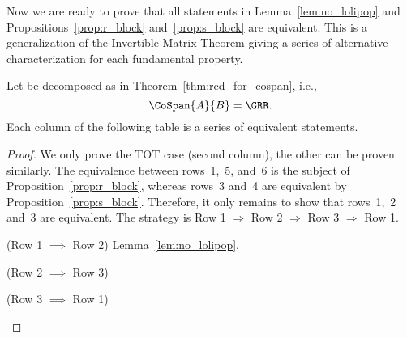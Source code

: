 \documentclass[manyauthors]{fundam}
\begin{document}
Now we are ready to prove that all statements in Lemma~\ref{lem:no_lolipop}
and Propositions~\ref{prop:r_block} and~\ref{prop:s_block} are equivalent.
This is a generalization of the Invertible Matrix Theorem
giving a series of alternative characterization for each fundamental property.

\begin{theorem}\label{thm:cospan_dict}
  Let  be decomposed as in Theorem~\ref{thm:rcd_for_cospan}, i.e.,
  \[ \CoSpan{A}{B} = \GRR.\]
  Each column of the following table is a series of equivalent statements.
  \begin{center}
  \end{center}
\end{theorem}
\begin{proof}
  We only prove the TOT case (second column), the other can be proven similarly.
  The equivalence between rows~1,~5, and~6
  is the subject of Proposition~\ref{prop:r_block},
  whereas rows~3 and~4 are equivalent by Proposition~\ref{prop:s_block}.
  Therefore, it only remains to show that rows~1,~2 and~3 are equivalent.
  The strategy is Row 1 $\Rightarrow$ Row 2 $\Rightarrow$ Row 3 $\Rightarrow$ Row 1.

  (Row 1 $\implies$ Row 2) Lemma~\ref{lem:no_lolipop}.

  (Row 2 $\implies$ Row 3)
    \begin{hcalculation}[=]{}
    \end{hcalculation}

  (Row 3 $\implies$ Row 1)
    \begin{hcalculation}[\supseteq]{}
    \end{hcalculation}
\end{proof}
\end{document}
